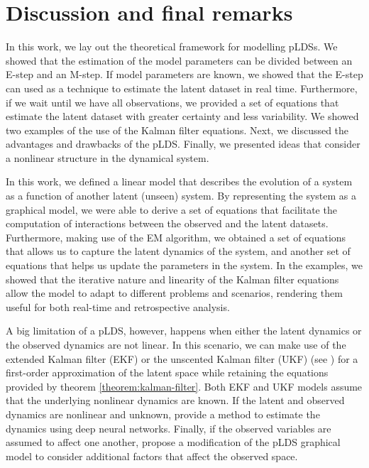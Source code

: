 \documentclass[12pt, oneside]{book}
\numberwithin{equation}{section}
\begin{document}
{\chapter{Discussion and final remarks}
In this work, we lay out the theoretical framework for modelling pLDSs. We showed that the estimation of the model parameters can be divided between an E-step and an M-step. If model parameters are known, we showed that the E-step can used as a technique to estimate the latent dataset in real time. Furthermore, if we wait until we have all observations, we provided a set of equations that estimate the latent dataset with greater certainty and less variability. We showed two examples of the use of the Kalman filter equations. Next, we discussed the advantages and drawbacks of the pLDS. Finally, we presented ideas that consider a nonlinear structure in the dynamical system.

In this work, we defined a linear model that describes the evolution of a system as a function of another latent (unseen) system. By representing the system as a graphical model, we were able to derive a set of equations that facilitate the computation of interactions between the observed and the latent datasets. Furthermore, making use of the EM algorithm, we obtained a set of equations that allows us to capture the latent dynamics of the system, and another set of equations that helps us update the parameters in the system. In the examples, we showed that the iterative nature and linearity of the Kalman filter equations allow the model to adapt to different problems and scenarios, rendering them useful for both real-time and retrospective analysis.

A big limitation of a pLDS, however, happens when either the latent dynamics or the observed dynamics are not linear. In this scenario, we can make use of the extended Kalman filter (EKF) or the unscented Kalman filter (UKF) (see \cite{pml2Book}) for a first-order approximation of the latent space while retaining the equations provided by theorem \ref{theorem:kalman-filter}. Both EKF and UKF models assume that the underlying nonlinear dynamics are known. If the latent and observed dynamics are nonlinear and unknown, \cite{krishnan2015deep} provide a method to estimate the  dynamics using deep neural networks. Finally, if the observed variables are assumed to affect one another, \cite{deeprl} propose a modification of the pLDS graphical model to consider additional factors that affect the observed space.



}
\end{document}
